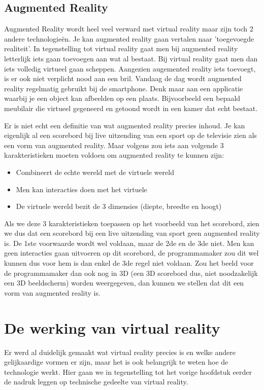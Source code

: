 \subsection{Augmented Reality}
\label{subsec:augmented-reality}
Augmented Reality wordt heel veel verward met virtual reality maar zijn toch 2 andere technologieën. Je kan augmented reality gaan vertalen naar 'toegevoegde realiteit'. In tegenstelling tot virtual reality gaat men bij augmented reality letterlijk iets gaan toevoegen aan wat al bestaat. Bij virtual reality gaat men dan iets volledig virtueel gaan scheppen. Aangezien augemented reality iets toevoegt, is er ook niet verplicht nood aan een bril. Vandaag de dag wordt augmented reality regelmatig gebruikt bij de smartphone. Denk maar aan een applicatie waarbij je een object kan afbeelden op een plaats. Bijvoorbeeld een bepaald meubilair die virtueel gegeneerd en getoond wordt in een kamer dat echt bestaat.



Er is niet echt een definitie van wat augmented reality precies inhoud. Je kan eigenlijk al een scorebord bij live uitzending van een sport op de televisie zien als een vorm van augmented reality. Maar volgens \autocite{Azuma1997} zou iets aan volgende 3 karakteristieken moeten voldoen om augmented reality te kunnen zijn:

\begin{itemize}
	\item Combineert de echte wereld met de virtuele wereld
	\item Men kan interacties doen met het virtuele
	\item De virtuele wereld bezit de 3 dimensies (diepte, breedte en hoogt)
\end{itemize}

Als we deze 3 karakteristieken toepassen op het voorbeeld van het scorebord, zien we dus dat een scorebord bij een live uitzending van sport geen augmented reality is. De 1ste voorwaarde wordt wel voldaan, maar de 2de en de 3de niet. Men kan geen interacties gaan uitvoeren op dit scorebord, de programmamaker zou dit wel kunnen dus voor hem is dan enkel de 3de regel niet voldaan. Zou het beeld voor de programmamaker dan ook nog in 3D (een 3D scorebord dus, niet noodzakelijk een 3D beeldscherm) worden weergegeven, dan kunnen we stellen dat dit een vorm van augmented reality is.


\section{De werking van virtual reality}
\label{sec:hoe-werkt-vr}
Er werd al duidelijk gemaakt wat virtual reality precies is en welke andere gelijkaardige vormen er zijn, maar het is ook belangrijk te weten hoe de technologie werkt. Hier gaan we in tegenstelling tot het vorige hoofdstuk eerder de nadruk leggen op technische gedeelte van virtual reality.

